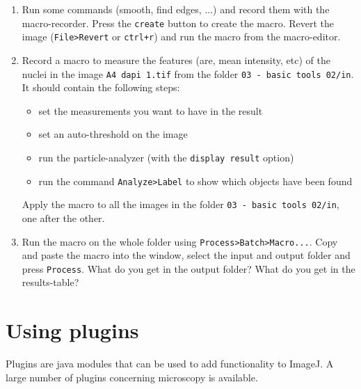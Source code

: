 \begin{enumerate}
\item Run some commands (smooth, find edges, ...) and record them with the macro-recorder. Press the \texttt{create} button to create the macro. Revert the image (\texttt{File>Revert} or \texttt{ctrl+r}) and run the macro from the macro-editor.

\item Record a macro to measure the features (are, mean intensity, etc) of the nuclei in the image \texttt{A4 dapi 1.tif} from the folder \texttt{03 - basic tools 02/in}. It should contain the following steps:
\begin{itemize}
\item set the measurements you want to have in the result
\item set an auto-threshold on the image
\item run the particle-analyzer (with the \texttt{display result} option)
\item run the command \texttt{Analyze>Label} to show which objects have been found

\end{itemize}
Apply the macro to all the images in the folder \texttt{03 - basic tools 02/in}, one after the other.

\item Run the macro on the whole folder using \texttt{Process>Batch>Macro...}. Copy and paste the
macro into the window, select the input and output folder and press \texttt{Process}. What do you
get in the output folder? What do you get in the results-table?

\fbox{
	\begin{minipage}{\linewidth}
		\hfill\vspace{2cm}
	\end{minipage}
	}
	
\end{enumerate}

\section{Using plugins}

Plugins are java modules that can be used to add functionality to ImageJ. A large number of plugins concerning microscopy is available.

